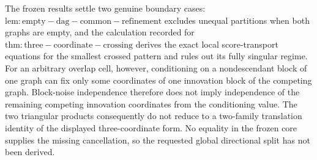 The frozen results settle two genuine boundary cases: \(\mathrm{lem:empty-dag-common-refinement}\) excludes unequal partitions when both graphs are empty, and the calculation recorded for \(\mathrm{thm:three-coordinate-crossing}\) derives the exact local score-transport equations for the smallest crossed pattern and rules out its fully singular regime.  For an arbitrary overlap cell, however, conditioning on a nondescendant block of one graph can fix only some coordinates of one innovation block of the competing graph.  Block-noise independence therefore does not imply independence of the remaining competing innovation coordinates from the conditioning value.  The two triangular products consequently do not reduce to a two-family translation identity of the displayed three-coordinate form.  No equality in the frozen core supplies the missing cancellation, so the requested global directional split has not been derived.